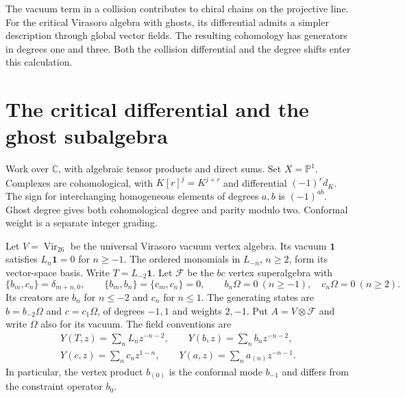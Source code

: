 The vacuum term in a collision contributes to chiral chains on the projective line.
For the critical Virasoro algebra with ghosts, its differential admits a simpler description through global vector fields.
The resulting cohomology has generators in degrees one and three.
Both the collision differential and the degree shifts enter this calculation.

\section{The critical differential and the ghost subalgebra}

Work over $\mathbb C$, with algebraic tensor products and direct sums.
Set $X=\mathbb P^1$.
Complexes are cohomological, with $K[r]^j=K^{j+r}$ and differential $(-1)^r d_K$.
The sign for interchanging homogeneous elements of degrees $a,b$ is $(-1)^{ab}$.
Ghost degree gives both cohomological degree and parity modulo two.
Conformal weight is a separate integer grading.

Let $V=\operatorname{Vir}_{26}$ be the universal Virasoro vacuum vertex algebra.
Its vacuum $\mathbf1$ satisfies $L_n\mathbf1=0$ for $n\geq-1$.
The ordered monomials in $L_{-n}$, $n\geq2$, form its vector-space basis.
Write $T=L_{-2}\mathbf1$.
Let $\mathcal F$ be the $bc$ vertex superalgebra with
\[
 \{b_m,c_n\}=\delta_{m+n,0},\qquad
 \{b_m,b_n\}=\{c_m,c_n\}=0,
 \qquad
 b_n\Omega=0\ (n\geq-1),\quad c_n\Omega=0\ (n\geq2).
\]
Its creators are $b_n$ for $n\leq-2$ and $c_n$ for $n\leq1$.
The generating states are $b=b_{-2}\Omega$ and $c=c_1\Omega$, of degrees $-1,1$ and weights $2,-1$.
Put $A=V\otimes\mathcal F$ and write $\Omega$ also for its vacuum.
The field conventions are
\begin{gather*}
 Y(T,z)=\sum_nL_nz^{-n-2},\qquad
 Y(b,z)=\sum_nb_nz^{-n-2},\\
 Y(c,z)=\sum_nc_nz^{1-n},\qquad
 Y(a,z)=\sum_na_{(n)}z^{-n-1}.
\end{gather*}
In particular, the vertex product $b_{(0)}$ is the conformal mode $b_{-1}$ and differs from the constraint operator $b_0$.

